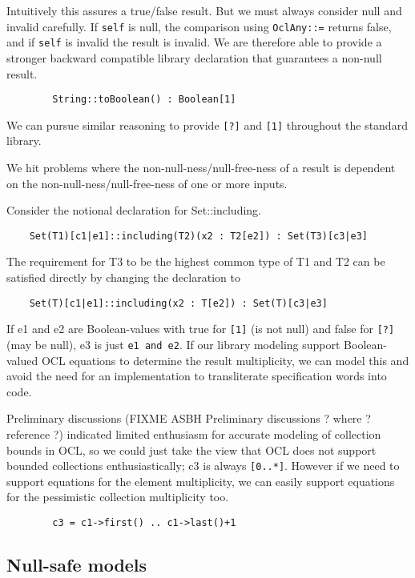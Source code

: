 \documentclass{llncs}
\begin{document}
Intuitively this assures a true/false result. But we must always consider null and invalid carefully. If \verb$self$ is null, the comparison using \verb$OclAny::=$ returns false, and if \verb$self$ is invalid the result is invalid. We are therefore able to provide a stronger backward compatible library declaration that guarantees a non-null result.
\begin{verbatim}
        String::toBoolean() : Boolean[1]
\end{verbatim}

We can pursue similar reasoning to provide \verb$[?]$ and \verb$[1]$ throughout the standard library.

We hit problems where the non-null-ness/null-free-ness of a result is dependent on the non-null-ness/null-free-ness of one or more inputs.

Consider the notional declaration for Set::including.
\begin{verbatim}
    Set(T1)[c1|e1]::including(T2)(x2 : T2[e2]) : Set(T3)[c3|e3]
\end{verbatim}

The requirement for T3 to be the highest common type of T1 and T2 can be satisfied directly by changing the declaration to
\begin{verbatim}
    Set(T)[c1|e1]::including(x2 : T[e2]) : Set(T)[c3|e3]
\end{verbatim}

If e1 and e2 are Boolean-values with true for \verb$[1]$ (is not null) and false for \verb$[?]$ (may be null), e3 is just \verb$e1 and e2$. If our library modeling support Boolean-valued OCL equations to determine the result multiplicity, we can model this and avoid the need for an implementation to transliterate specification words into code.

Preliminary discussions (FIXME ASBH Preliminary discussions ? where ? reference ?) indicated limited enthusiasm for accurate modeling of collection bounds in OCL, so we could just take the view that OCL does not support bounded collections enthusiastically; c3 is always \verb$[0..*]$. However if we need to support equations for the element multiplicity, we can easily support equations for the pessimistic collection multiplicity too. 

\begin{verbatim}
        c3 = c1->first() .. c1->last()+1
\end{verbatim}

\subsection{Null-safe models}    
      
\end{document}
